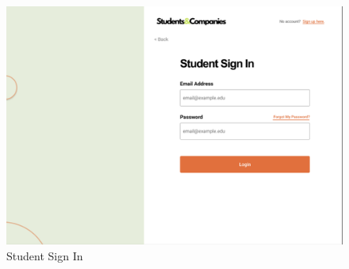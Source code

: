 \documentclass[a4paper,12pt]{article}
\begin{document}
\begin{figure}[H]
    \centering
    \includegraphics[scale = 0.40]{figures/UserInterfaces/General/StudentSignIn.png}
    \caption{Student Sign In}
     \centering
\end{figure}
\end{document}
